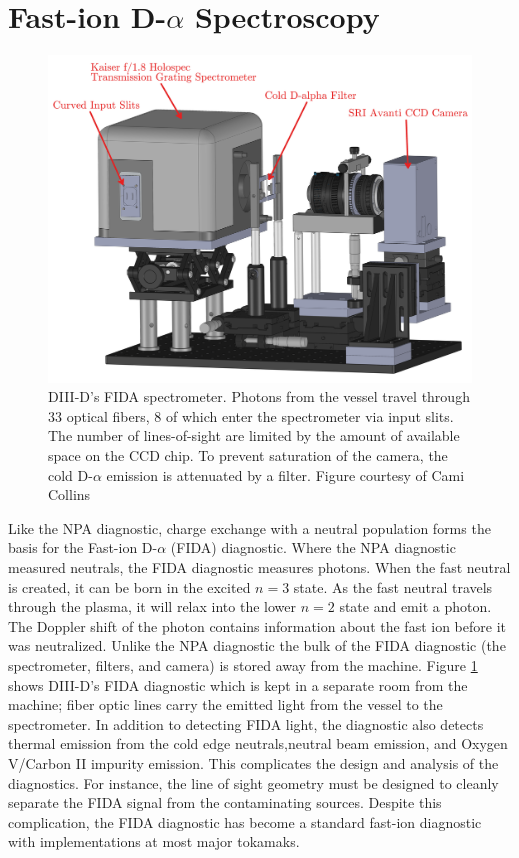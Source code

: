 \section{Fast-ion D-$\alpha$ Spectroscopy}
\begin{figure}[ht]
    \centering
    \includegraphics[width=12cm]{figures/d3d_fida.jpg}
    \caption{DIII-D's FIDA spectrometer\cite{muscatello2010}. Photons from the vessel travel through 33 optical fibers, 8 of which enter the spectrometer via input slits. The number of lines-of-sight are limited by the amount of available space on the CCD chip. To prevent saturation of the camera, the cold D-$\alpha$ emission is attenuated by a filter. Figure courtesy of Cami Collins}
    \label{fig:fida}
\end{figure}
Like the NPA diagnostic, charge exchange with a neutral population forms the basis for the Fast-ion D-$\alpha$ (FIDA) diagnostic\cite{heidbrink2004fida}. Where the NPA diagnostic measured neutrals, the FIDA diagnostic measures photons. When the fast neutral is created, it can be born in the excited $n=3$ state. As the fast neutral travels through the plasma, it will relax into the lower $n=2$ state and emit a photon. The Doppler shift of the photon contains information about the fast ion before it was neutralized. Unlike the NPA diagnostic the bulk of the FIDA diagnostic (the spectrometer, filters, and camera) is stored away from the machine. Figure \ref{fig:fida} shows DIII-D's FIDA diagnostic which is kept in a separate room from the machine; fiber optic lines carry the emitted light from the vessel to the spectrometer. In addition to detecting FIDA light, the diagnostic also detects thermal emission from the cold edge neutrals,neutral beam emission, and Oxygen V/Carbon II impurity emission. This complicates the design and analysis of the diagnostics. For instance, the line of sight geometry must be designed to cleanly separate the FIDA signal from the contaminating sources. Despite this complication, the FIDA diagnostic has become a standard fast-ion diagnostic with implementations at most major tokamaks\cite{heidbrink2010fast}.

